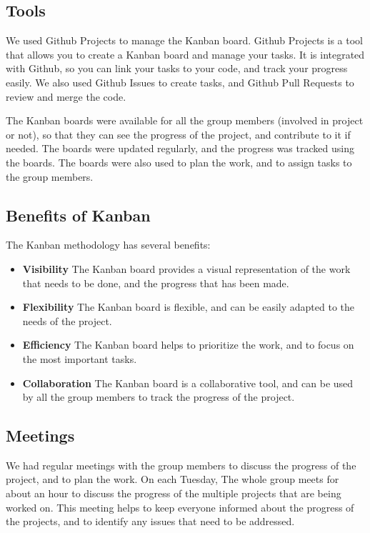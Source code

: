 \begin{spacing}{1.2}
    \subsection{Tools}
    We used Github Projects to manage the Kanban board. Github Projects is a tool that allows you to create a Kanban board
    and manage your tasks. It is integrated with Github, so you can link your tasks to your code, and track your progress
    easily. We also used Github Issues to create tasks, and Github Pull Requests to review and merge the code.

    The Kanban boards were available for all the group members (involved in project or not), so that they can see the progress
    of the project, and contribute to it if needed. The boards were updated regularly, and the progress was tracked using the
    boards. The boards were also used to plan the work, and to assign tasks to the group members.

    \subsection{Benefits of Kanban}
    The Kanban methodology has several benefits:
    \begin{itemize}
        \item \textbf{Visibility} The Kanban board provides a visual representation of the work
              that needs to be done, and the progress that has been made.
        \item \textbf{Flexibility} The Kanban board is flexible, and can be easily adapted to
              the needs of the project.
        \item \textbf{Efficiency} The Kanban board helps to prioritize the work, and to focus
              on the most important tasks.
        \item \textbf{Collaboration} The Kanban board is a collaborative tool, and can
              be used by all the group members to track the progress of the project.

    \end{itemize}

    \subsection{Meetings}
    We had regular meetings with the group members to discuss the progress of the project, and to plan the work.
    On each Tuesday, The whole group meets for about an hour to discuss the progress of the multiple projects that are being worked on.
    This meeting helps to keep everyone informed about the progress of the projects, and to identify any issues that need to be addressed.


\end{spacing}
